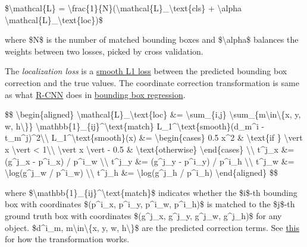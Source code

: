 \$\textbackslash mathcal\{L\} = \textbackslash frac\{1\}\{N\}(\textbackslash mathcal\{L\}\_\textbackslash text\{cls\} + \textbackslash alpha \textbackslash mathcal\{L\}\_\textbackslash text\{loc\})\$

where \$N\$ is the number of matched bounding boxes and \$\textbackslash alpha\$ balances the weights between two losses, picked by cross validation.

The \emph{localization loss} is a \href{https://github.com/rbgirshick/py-faster-rcnn/files/764206/SmoothL1Loss.1.pdf}{smooth L1 loss} between the predicted bounding box correction and the true values. The coordinate correction transformation is same as what \href{https://lilianweng.github.io/posts/2017-12-31-object-recognition-part-3/\#r-cnn}{R-CNN} does in \href{https://lilianweng.github.io/posts/2017-12-31-object-recognition-part-3/\#bounding-box-regression}{bounding box regression}.

\$\$ \textbackslash begin\{aligned\} \textbackslash mathcal\{L\}\_\textbackslash text\{loc\} \&= \textbackslash sum\_\{i,j\} \textbackslash sum\_\{m\textbackslash in\textbackslash\{x, y, w, h\textbackslash\}\} \textbackslash mathbb\{1\}\_\{ij\}\^{}\textbackslash text\{match\} L\_1\^{}\textbackslash text\{smooth\}(d\_m\^{}i - t\_m\^{}j)\^{}2\textbackslash\textbackslash{} L\_1\^{}\textbackslash text\{smooth\}(x) \&= \textbackslash begin\{cases\} 0.5 x\^{}2 \& \textbackslash text\{if \} \textbackslash vert x \textbackslash vert \textless{} 1\textbackslash\textbackslash{} \textbackslash vert x \textbackslash vert - 0.5 \& \textbackslash text\{otherwise\} \textbackslash end\{cases\} \textbackslash\textbackslash{} t\^{}j\_x \&= (g\^{}j\_x - p\^{}i\_x) / p\^{}i\_w \textbackslash\textbackslash{} t\^{}j\_y \&= (g\^{}j\_y - p\^{}i\_y) / p\^{}i\_h \textbackslash\textbackslash{} t\^{}j\_w \&= \textbackslash log(g\^{}j\_w / p\^{}i\_w) \textbackslash\textbackslash{} t\^{}j\_h \&= \textbackslash log(g\^{}j\_h / p\^{}i\_h) \textbackslash end\{aligned\} \$\$

where \$\textbackslash mathbb\{1\}\_\{ij\}\^{}\textbackslash text\{match\}\$ indicates whether the \$i\$-th bounding box with coordinates \$(p\^{}i\_x, p\^{}i\_y, p\^{}i\_w, p\^{}i\_h)\$ is matched to the \$j\$-th ground truth box with coordinates \$(g\^{}j\_x, g\^{}j\_y, g\^{}j\_w, g\^{}j\_h)\$ for any object. \$d\^{}i\_m, m\textbackslash in\textbackslash\{x, y, w, h\textbackslash\}\$ are the predicted correction terms. See \href{https://lilianweng.github.io/posts/2017-12-31-object-recognition-part-3/\#bounding-box-regression}{this} for how the transformation works.


